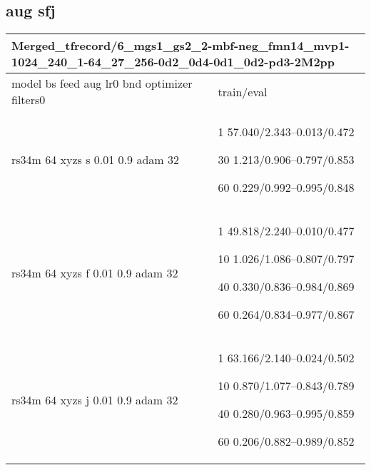 \documentclass[,table,dvipsnames]{article}
\begin{document}
\subsection{aug sfj}
\noindent\begin{tabular}{|p{9cm}|p{6cm}| }	
	\hline
	\multicolumn{2}{|p{15cm}|}{Merged\_tfrecord/6\_mgs1\_gs2\_2-mbf-neg\_fmn14\_mvp1-1024\_240\_1-64\_27\_256-0d2\_0d4-0d1\_0d2-pd3-2M2pp}\\
	\hline
	model bs feed aug lr0 bnd optimizer filters0 & train/eval \\
	
	\rowcolor{yellow!20}
	rs34m 64 xyzs s 0.01 0.9 adam 32&1 57.040/2.343--0.013/0.472\par 30 1.213/0.906--0.797/0.853\par 60 0.229/0.992--0.995/0.848\\
	
	\rowcolor{red!20}
	rs34m 64 xyzs f 0.01 0.9 adam 32& 1 49.818/2.240--0.010/0.477\par 10 1.026/1.086--0.807/0.797\par 40 0.330/0.836--0.984/0.869\par 60 0.264/0.834--0.977/0.867\\
	
	\rowcolor{blue!20}
	rs34m 64 xyzs j 0.01 0.9 adam 32& 1 63.166/2.140--0.024/0.502\par 10 0.870/1.077--0.843/0.789\par 40 0.280/0.963--0.995/0.859\par 60 0.206/0.882--0.989/0.852\\
	\hline
	
\end{tabular}
\end{document}
